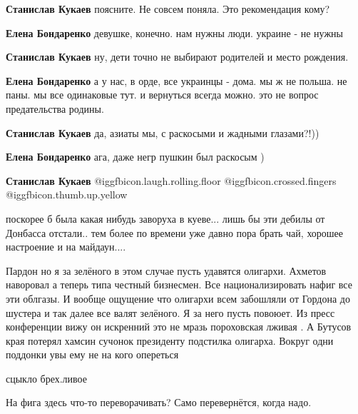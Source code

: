 \begin{itemize}
\begin{itemize}
\textbf{Станислав Кукаев} поясните. Не совсем поняла. Это рекомендация кому?

\textbf{Елена Бондаренко} девушке, конечно.
нам нужны люди. украине - не нужны

\textbf{Станислав Кукаев} ну, дети точно не выбирают родителей и место рождения.

\textbf{Елена Бондаренко} а у нас, в орде, все украинцы - дома.
мы ж не польша. не паны. мы все одинаковые тут.
и вернуться всегда можно.
это не вопрос предательства родины.

\textbf{Станислав Кукаев} да, азиаты мы, с раскосыми и жадными глазами?!))

\textbf{Елена Бондаренко} ага, даже негр пушкин был раскосым )

\textbf{Станислав Кукаев}  @igg{fbicon.laugh.rolling.floor}  @igg{fbicon.crossed.fingers}  @igg{fbicon.thumb.up.yellow} 

\end{itemize} %


поскорее б была какая нибудь заворуха в куеве... лишь бы эти дебилы от Донбасса
отстали.. тем более по времени уже давно пора брать чай, хорошее настроение и
на майдаун....


Пардон но я за зелёного в этом случае пусть удавятся олигархи. Ахметов
наворовал а теперь типа честный бизнесмен. Все национализировать нафиг все эти
облгазы. И вообще ощущение что олигархи всем забошляли от Гордона до шустера и
так далее все валят зелёного. Я за него пусть повоюет. Из пресс конференции
вижу он искренний это не мразь пороховская лживая . А Бутусов края потерял
хамсин сучонок президенту подстилка олигарха. Вокруг одни поддонки увы ему не
на кого опереться

сцыкло брех.ливое

На фига здесь что-то переворачивать? Само перевернётся, когда надо.

\end{itemize} %
